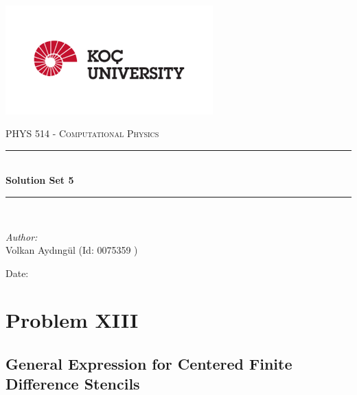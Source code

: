 \documentclass[letterpaper,12pt]{article}
\newcommand{\reporttitle}{Solution Set 5}
\newcommand{\reportauthor}{ Volkan Aydıngül (Id: 0075359 )\\
                            }
\begin{document}
\begin{titlepage}
\newcommand{\HRule}{\rule{\linewidth}{0.5mm}}
\begin{center} %
\includegraphics[width = 8cm]{figures/koc_logo.png}

\textsc{\Large PHYS 514 - Computational Physics}\\[1.5cm] 
\HRule \\[0.6cm]
{ \huge \bfseries \reporttitle}\\ %
\HRule \\[1.5cm]
\end{center}
\vspace{2cm}
\begin{flushleft} \large
\textit{Author:}\\
\reportauthor%
\end{flushleft}
\vspace{2cm}
\makeatletter
Date: \@date 
\vfill %
\makeatother
\end{titlepage}




\tableofcontents
\newpage






\section{Problem XIII}
\subsection{General Expression for Centered Finite Difference Stencils}
\end{document}
